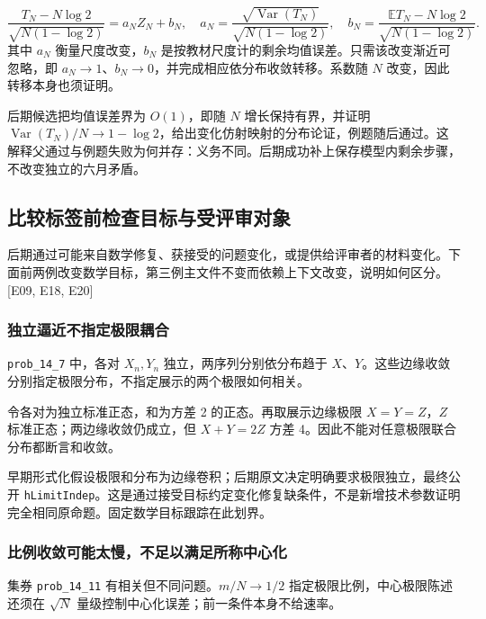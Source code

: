 \[
\frac{T_N-N\log 2}{\sqrt{N(1-\log 2)}}=a_N Z_N+b_N,
\quad
a_N=\frac{\sqrt{\operatorname{Var}(T_N)}}{\sqrt{N(1-\log 2)}},
\quad
b_N=\frac{\mathbb E T_N-N\log 2}{\sqrt{N(1-\log 2)}}.
\]
其中 $a_N$ 衡量尺度改变，$b_N$ 是按教材尺度计的剩余均值误差。只需该改变渐近可忽略，即 $a_N\to1$、$b_N\to0$，并完成相应依分布收敛转移。系数随 $N$ 改变，因此转移本身也须证明。

后期候选把均值误差界为 $O(1)$，即随 $N$ 增长保持有界，并证明 $\operatorname{Var}(T_N)/N\to1-\log2$，给出变化仿射映射的分布论证，例题随后通过。这解释父通过与例题失败为何并存：义务不同。后期成功补上保存模型内剩余步骤，不改变独立的六月矛盾。

\subsection[比较标签前检查目标与受评审对象]{\texorpdfstring{\protect\hypertarget{l4}{}比较标签前检查目标与受评审对象}{比较标签前检查目标与受评审对象}}
后期通过可能来自数学修复、获接受的问题变化，或提供给评审者的材料变化。下面前两例改变数学目标，第三例主文件不变而依赖上下文改变，说明如何区分。[E09, E18, E20]

\subsubsection[独立逼近不指定极限耦合]{\texorpdfstring{\protect\hypertarget{l4-1}{}独立逼近不指定极限耦合}{独立逼近不指定极限耦合}}
\nolinkurl{prob_14_7} 中，各对 $X_n,Y_n$ 独立，两序列分别依分布趋于 $X$、$Y$。这些边缘收敛分别指定极限分布，不指定展示的两个极限如何相关。

令各对为独立标准正态，和为方差 2 的正态。再取展示边缘极限 $X=Y=Z$，$Z$ 标准正态；两边缘收敛仍成立，但 $X+Y=2Z$ 方差 4。因此不能对任意极限联合分布都断言和收敛。

早期形式化假设极限和分布为边缘卷积；后期原文决定明确要求极限独立，最终公开 \nolinkurl{hLimitIndep}。这是通过接受目标约定变化修复缺条件，不是新增技术参数证明完全相同原命题。固定数学目标跟踪在此划界。

\subsubsection[比例收敛可能太慢，不足以满足所称中心化]{\texorpdfstring{\protect\hypertarget{l4-2}{}比例收敛可能太慢，不足以满足所称中心化}{比例收敛可能太慢，不足以满足所称中心化}}
集券 \nolinkurl{prob_14_11} 有相关但不同问题。$m/N\to1/2$ 指定极限比例，中心极限陈述还须在 $\sqrt N$ 量级控制中心化误差；前一条件本身不给速率。

